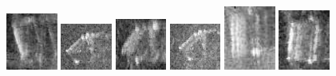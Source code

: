 \begin{figure}
    \includegraphics[width=0.15\textwidth]{chapters/images/dataset/all-class-images/can/can-304.jpg}
    \includegraphics[width=0.15\textwidth]{chapters/images/dataset/all-class-images/can/can-20.jpg}
    \includegraphics[width=0.15\textwidth]{chapters/images/dataset/all-class-images/can/can-80.jpg}
    \includegraphics[width=0.15\textwidth]{chapters/images/dataset/all-class-images/can/can-35.jpg}
    \includegraphics[width=0.15\textwidth]{chapters/images/dataset/all-class-images/can/can-329.jpg}
    \includegraphics[width=0.15\textwidth]{chapters/images/dataset/all-class-images/can/can-204.jpg}
    

\end{figure}
